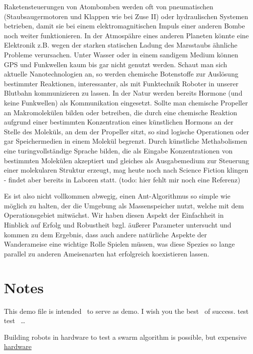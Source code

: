 Raketensteuerungen von Atombomben werden oft von pneumatischen
(Staubsaugermotoren und Klappen wie bei Zuse II) oder hydraulischen
Systemen betrieben, damit sie bei einem elektromagnitischen Impuls einer
anderen Bombe noch weiter funktionieren. In der Atmospähre eines anderen
Planeten könnte eine Elektronik z.B. wegen der starken statischen Ladung
des Marsstaubs ähnliche Probleme verursachen. Unter Wasser oder in einem
sandigem Medium können GPS und Funkwellen kaum bis gar nicht genutzt
werden. Schaut man sich aktuelle Nanotechnologien an, so werden
chemische Botenstoffe zur Auslösung bestimmter Reaktionen,
interessanter, als mit Funktechnik Roboter in unserer Blutbahn
kommunizieren zu lassen. In der Natur werden bereits Hormone (und keine
Funkwellen) als Kommunikation eingesetzt. Sollte man chemische Propeller
an Makromolekülen bilden oder betreiben, die durch eine chemische
Reaktion aufgrund einer bestimmten Konzentration eines künstlichen
Hormons an der Stelle des Moleküls, an dem der Propeller sitzt, so sind
logische Operationen oder gar Speichermedien in einem Molekül begrenzt.
Durch künstliche Methabolismen eine turingvollständige Sprache bilden,
die als Eingabe Konzentrationen von bestimmten Molekülen akzeptiert und
gleiches als Ausgabemedium zur Steuerung einer molekularen Struktur
erzeugt, mag heute noch nach Science Fiction klingen - findet aber
bereits in Laboren statt. (todo: hier fehlt mir noch eine Referenz)

Es ist also nicht vollkommen abwegig, einen Ant-Algorithmus so simple
wie möglich zu halten, der die Umgebung als Massenspeicher nutzt, welche
mit dem Operationsgebiet mitwächst. Wir haben diesen Aspekt der
Einfachheit in Hinblick auf Erfolg und Robustheit bzgl. äußerer
Parameter untersucht und kommen zu dem Ergebnis, dass auch andere
natürliche Aspekte der Wanderameise eine wichtige Rolle Spielen müssen,
was diese Spezies so lange parallel zu anderen Ameisenarten hat
erfolgreich koexistieren lassen.

\section{Notes}\label{notes}

This demo file is intended~\cite{Tentschert2000} to serve as demo. I wish
you the best~\cite{li2014chaos} of success. test
test~\cite{gonzalez2017smells} \ldots{}

Building robots in hardware to test a swarm algorithm is possible, but
expensive
\href{https://en.wikipedia.org/wiki/Swarm_robotic_platforms}{hardware}

